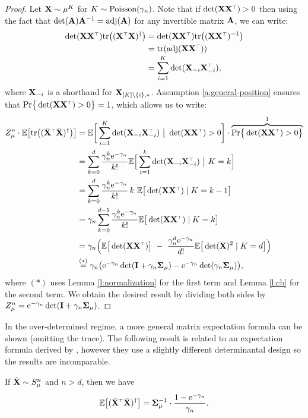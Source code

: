 \documentclass[11pt]{article}
\begin{document}
\begin{proof}
Let $\mathbf X\sim\mu^K$ for $K\sim{\operatorname{Poisson}}({\gamma_n})$. Note that if
$\det(\X\X^\top)>0$ then using the fact that
$\det(\mathbf A)\mathbf A^{-1}=\operatorname{\textnormal{adj}}(\mathbf A)$ for any invertible matrix $\mathbf A$, we can write:
  \begin{align*}
    \det(\X\X^\top)\tr\big((\X^\top\X)^{\dagger}\big)
    &= \det(\X\X^\top)\tr\big((\X\X^\top)^{-1}\big) \\
    &= \tr(\adj(\X\X^\top)) \\[-1mm]
    &= \sum_{i=1}^K\det(\X_{-i}\X_{-i}^\top),
  \end{align*}
  where $\mathbf X_{-i}$ is a shorthand for $\mathbf X_{[K]\backslash\{i\},*}$.
Assumption \ref{a:general-position} ensures that
$\Pr\big\{\det(\X\X^\top)>0\big\}=1$, which allows us to write:
  \begin{align*}
Z_\mu^n\cdot \E\big[\tr\big((\Xb^\top\Xb)^{\dagger}\big)\big]
    &=\E\bigg[
    \sum_{i=1}^K\det(\X_{-i}\X_{-i}^\top)\ \big|\ 
    \det(\X\X^\top)>0\bigg]\cdot\overbrace{\Pr\big\{\det(\X\X^\top)>0\big\}}^{1}\\
    &=\sum_{k=0}^d\frac{\gamma_n^{k}\ee^{-\gamma_n}}{k!}\E\Big[
      \sum_{i=1}^k\det(\X_{-i}\X_{-i}^\top)\ \big|\  K=k\Big]\\
    &=\sum_{k=0}^d\frac{\gamma_n^{k}\ee^{-\gamma_n}}{k!}\, k\
      \E\big[\det(\X\X^\top)\mid K=k-1\big]\\
    &=\gamma_n\sum_{k=0}^{d-1}\frac{\gamma_n^{k}\ee^{-\gamma_n}}{k!}
      \E\big[\det(\X\X^\top)\mid K=k\big]\\
    &=\gamma_n\Big(\E\big[\det(\X\X^\top)\big]\ -\
      \frac{\gamma_n^{d}\ee^{-\gamma_n}}{d!}\E\big[\det(\X)^2\mid K=d\big]
      \Big) \\
    &\overset{(*)}{=}\gamma_n\big(\ee^{-\gamma_n}\det(\I +\gamma_n\Sigmab_\mu) -
      \ee^{-\gamma_n}\det(\gamma_n\Sigmab_\mu)\big),
  \end{align*}
  where $(*)$ uses Lemma \ref{l:normalization} for the first term and
  Lemma \ref{l:cb} for the second term. We obtain the desired result by
  dividing both sides by
  $Z_\mu^n=\mathrm{e}^{-\gamma_n}\det(\mathbf I+\gamma_n\mathbf{\Sigma}_\mu)$. 
\end{proof}
In the over-determined regime, a more general matrix expectation
formula can be shown (omitting the trace). The following result is
related to an expectation formula derived by
\cite{correcting-bias-journal}, however they use a slightly
different determinantal design so the results are incomparable.
\begin{lemma}\label{l:sqinv-over}
If ${\bar{\mathbf X}}\sim S_\mu^n$ and $n>d$, then we
have
\begin{align*}
  \E\big[ (\Xb^\top\Xb)^{\dagger}\big] =
  \Sigmab_\mu^{-1}\cdot \frac{1-\ee^{-\gamma_n}}{\gamma_n}.
\end{align*}
\end{lemma}
\end{document}
